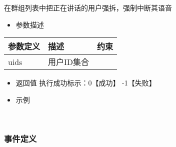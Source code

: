 \documentclass[letterpaper,10pt,english]{sphinxmanual}
\begin{document}
在群组列表中把正在讲话的用户强拆，强制中断其语音

%
\begin{sphinxVerbatim}[commandchars=\\\{\}]
  \PYG{p}{[}\PYG{p}{]} 
\end{sphinxVerbatim}
\begin{itemize}
\item {} 
参数描述

\end{itemize}


\begin{savenotes}\sphinxattablestart
\centering
\begin{tabulary}{\linewidth}[t]{|T|T|T|}
\hline
\sphinxstyletheadfamily 
参数定义
&\sphinxstyletheadfamily 
描述
&\sphinxstyletheadfamily 
约束
\\
\hline
uids
&
用户ID集合
&
\textendash{}
\\
\hline
\end{tabulary}
\par
\sphinxattableend\end{savenotes}
\begin{itemize}
\item {} 
返回值 执行成功标示：0【成功】 -1【失败】

\item {} 
示例

\end{itemize}

%
\begin{sphinxVerbatim}[commandchars=\\\{\}]
   
   \PYG{p}{[}\PYG{p}{]}   
\end{sphinxVerbatim}

​


\subsubsection{事件定义}
\label{\detokenize{csharp:id74}}
\end{document}
